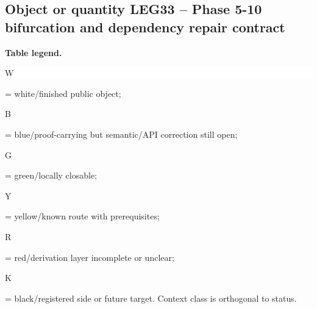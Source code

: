 \subsection*{Object or quantity LEG33 -- Phase 5-10 bifurcation and dependency repair contract}
\hypertarget{objproof:LEG33}{}
\par\smallskip\noindent\begin{minipage}{0.99\linewidth}\footnotesize\raggedright\textbf{Table legend.} \colorbox{white}{\strut W} = white/finished public object; \colorbox{cyan!20}{\strut B} = blue/proof-carrying but semantic/API correction still open; \colorbox{green!18}{\strut G} = green/locally closable; \colorbox{yellow!25}{\strut Y} = yellow/known route with prerequisites; \colorbox{red!20}{\strut R} = red/derivation layer incomplete or unclear; \colorbox{black!18}{\strut K} = black/registered side or future target. Context class is orthogonal to status.\end{minipage}\par\vspace{0.25em}
